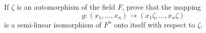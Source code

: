If $\zeta$ is an automorphism of the field $F$, prove that the mapping
$$g: (x_1, \ldots, x_n) \rightarrow (x_1\zeta, \ldots, x_n\zeta)$$
is a semi-linear isomorphism of $F^n$ onto itself with respect to $\zeta$.
